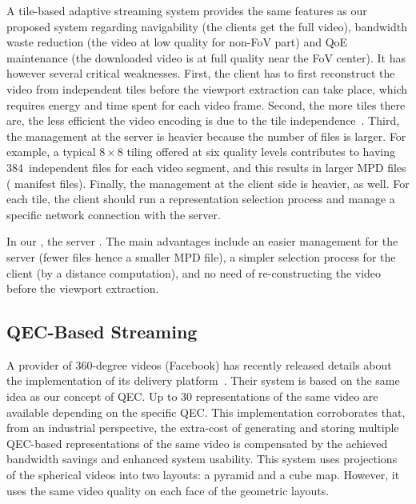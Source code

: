 A tile-based adaptive streaming system provides the same features as
our proposed system regarding navigability (the clients get the full
video), bandwidth waste reduction (the video at low quality for
non-\ac{FoV} part) and \ac{QoE} maintenance (the downloaded video is
at full quality near the \ac{FoV} center). It has however several
critical weaknesses. First, the client has to first reconstruct the
video from independent tiles before the viewport extraction can take
place, which requires energy and time spent for each video frame.
Second, the more tiles there are, the less efficient the video
encoding is due to the tile
independence~\cite{sanchez_compressed_2015}. Third, the management at
the server is heavier because the number of files is larger. For
example, a typical $8\times8$ tiling offered at six quality levels
contributes to having 384~independent files for each video segment,
and this results in larger \ac{MPD} files ( manifest
files). Finally, the management at the client side is heavier, as
well. For each tile, the client should run a representation selection
process and manage a specific network connection with the server.

In our , the server 
.
The main advantages include
an easier management for the server (fewer files hence a smaller
\ac{MPD} file), a simpler selection process for the client (by a
distance computation), and no need of re-constructing the video before
the viewport extraction.

\subsection{QEC-Based Streaming}

A  provider of 360-degree videos (Facebook) has recently
released details about the implementation of its delivery
platform~\cite{facebook}. Their system is based on the same idea as
our concept of \ac{QEC}. Up to 30 representations of the same video
are available depending on the specific \ac{QEC}. This implementation
corroborates that, from an industrial perspective, the extra-cost of
generating and storing multiple \ac{QEC}-based representations of the
same video is compensated by the achieved bandwidth savings and
enhanced system usability. This system uses projections of the
spherical videos into two layouts: a pyramid and a cube map. However, it
uses the same video quality on each face of the geometric layouts.

